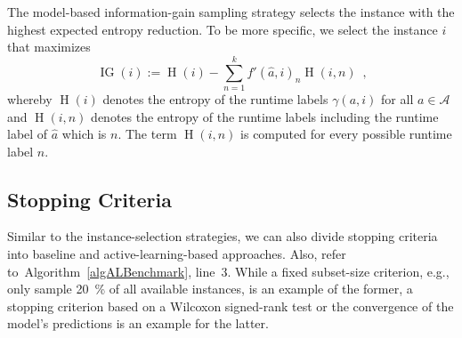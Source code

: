 \documentclass[runningheads]{llncs}
\begin{document}
The model-based information-gain sampling strategy selects the instance with the highest expected entropy reduction.
To be more specific, we select the instance $i$ that maximizes
\begin{equation}
  \operatorname{IG}\!\left(i\right) := \operatorname{H}\!\left(i\right) - \sum_{n = 1}^{k} f'\!\left(\hat{a}, i\right)_{n} \operatorname{H}\!\left(i, n\right) \enspace \textrm{,}
\end{equation}
whereby $\operatorname{H}\!\left(i\right)$ denotes the entropy of the runtime labels $\gamma\!\left(a, i\right)$ for all $a \in \mathcal{A}$ and $\operatorname{H}\!\left(i, n\right)$ denotes the entropy of the runtime labels including the runtime label of $\hat{a}$ which is $n$.
The term $\operatorname{H}\!\left(i, n\right)$ is computed for every possible runtime label $n$.


\subsection{Stopping Criteria}
\label{sec:main3}
Similar to the instance-selection strategies, we can also divide stopping criteria into baseline and active-learning-based approaches.
Also, refer to~Algorithm~\ref{algALBenchmark}, line~3.
While a fixed subset-size criterion, e.g., only sample \SI{20}{\%} of all available instances, is an example of the former, a stopping criterion based on a Wilcoxon signed-rank test or the convergence of the model's predictions is an example for the latter.
\end{document}

